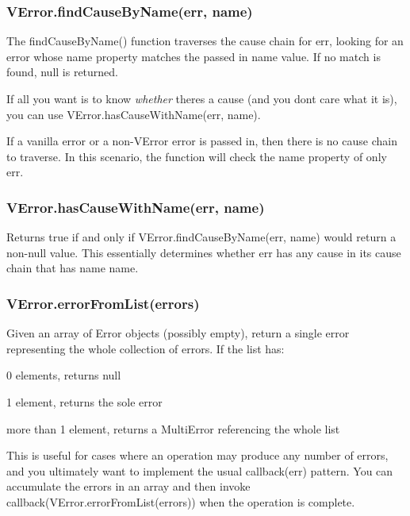 \subsubsection*{{\ttfamily V\+Error.\+find\+Cause\+By\+Name(err, name)}}

The {\ttfamily find\+Cause\+By\+Name()} function traverses the cause chain for {\ttfamily err}, looking for an error whose {\ttfamily name} property matches the passed in {\ttfamily name} value. If no match is found, {\ttfamily null} is returned.

If all you want is to know {\itshape whether} there\textquotesingle{}s a cause (and you don\textquotesingle{}t care what it is), you can use {\ttfamily V\+Error.\+has\+Cause\+With\+Name(err, name)}.

If a vanilla error or a non-\/\+V\+Error error is passed in, then there is no cause chain to traverse. In this scenario, the function will check the {\ttfamily name} property of only {\ttfamily err}.

\subsubsection*{{\ttfamily V\+Error.\+has\+Cause\+With\+Name(err, name)}}

Returns true if and only if {\ttfamily V\+Error.\+find\+Cause\+By\+Name(err, name)} would return a non-\/null value. This essentially determines whether {\ttfamily err} has any cause in its cause chain that has name {\ttfamily name}.

\subsubsection*{{\ttfamily V\+Error.\+error\+From\+List(errors)}}

Given an array of Error objects (possibly empty), return a single error representing the whole collection of errors. If the list has\+:


\begin{DoxyItemize}
\item 0 elements, returns {\ttfamily null}
\item 1 element, returns the sole error
\item more than 1 element, returns a Multi\+Error referencing the whole list
\end{DoxyItemize}

This is useful for cases where an operation may produce any number of errors, and you ultimately want to implement the usual {\ttfamily callback(err)} pattern. You can accumulate the errors in an array and then invoke {\ttfamily callback(V\+Error.\+error\+From\+List(errors))} when the operation is complete.

